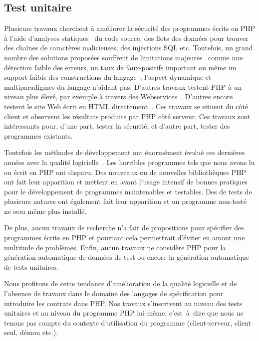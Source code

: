 \subsection{Test unitaire}

Plusieurs travaux cherchent à améliorer la sécurité des programmes écrits en PHP
à l'aide d'analyses statiques~ du code source, des flots des données pour trouver des
chaînes de caractères malicieuses, des injections SQL etc. Toutefois, un grand
nombre des solutions proposées souffrent de limitations
majeures~ comme une détection faible des erreurs, un taux de
faux-positifs important ou même un support faible des constructions du langage~;
l'aspect dynamique et multiparadigmes du langage n'aidant pas. D'autres travaux
testent PHP à un niveau plus élevé, par exemple à travers des
Webservices~\acite{}. D'autres encore testent le site Web écrit en HTML
directement~. Ces
travaux se situent du côté client et observent les résultats produits par PHP
côté serveur. Ces travaux sont intéressants pour, d'une part, tester la
sécurité, et d'autre part, tester des programmes existants.

Toutefois les méthodes de développement ont énormément évolué ces dernières
années avec la qualité logicielle~. Les horribles programmes
tels que nous avons lu ou écrit en PHP ont disparu. Des nouveaux
 ou de nouvelles bibliothèques PHP ont fait leur
apparition et mettent en avant l'usage intensif de bonnes pratiques pour le
développement de programmes maintenables et testables. Des
 de tests de plusieurs natures ont également fait leur
apparition et un programme non-testé ne sera même plus installé. 

De plus, aucun travaux de recherche n'a fait de propositions pour spécifier des
programmes écrits en PHP et pourtant cela permettrait d'éviter en amont une
multitude de problèmes. Enfin, aucun travaux ne considère PHP pour la génération
automatique de données de test ou encore la génération automatique de tests
unitaires.

Nous profitons de cette tendance d'amélioration de la qualité logicielle et de
l'absence de travaux dans le domaine des langages de spécification pour
introduire les contrats dans PHP. Nos travaux s'inscrivent au niveau des tests
unitaires et au niveau du programme PHP lui-même, c'est~à~dire que nous ne
tenons pas compte du contexte d'utilisation du programme (client-serveur, client
seul, démon etc.).

